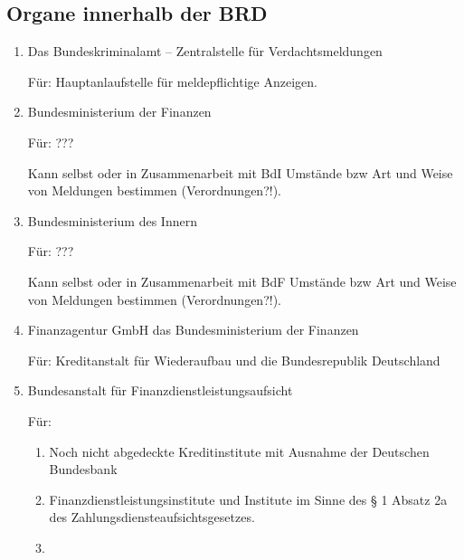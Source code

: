 \documentclass{article}
\begin{document}
        \subsection[Organe BRD]{Organe innerhalb der BRD}

            \begin{enumerate}

                \item Das Bundeskriminalamt – Zentralstelle für Verdachtsmeldungen

                    Für: Hauptanlaufstelle für meldepflichtige Anzeigen.

                \item Bundesministerium der Finanzen

                    Für: ???

                    Kann selbst oder in Zusammenarbeit mit BdI Umstände bzw Art und Weise von Meldungen bestimmen (Verordnungen?!).

                \item Bundesministerium des Innern

                    Für: ???

                    Kann selbst oder in Zusammenarbeit mit BdF Umstände bzw Art und Weise von Meldungen bestimmen (Verordnungen?!).                

                \item Finanzagentur GmbH das Bundesministerium der Finanzen

                     Für: Kreditanstalt für Wiederaufbau und die Bundesrepublik Deutschland

                \item Bundesanstalt für Finanzdienstleistungsaufsicht
                   
                    Für: 
                    \begin{enumerate}
                        \item
                            
                            Noch nicht abgedeckte Kreditinstitute mit Ausnahme der Deutschen Bundesbank

                        \item

                            Finanzdienstleistungsinstitute und Institute im Sinne des § 1 Absatz
                            2a des Zahlungsdiensteaufsichtsgesetzes.

                        \item


\end{enumerate}
\end{enumerate}
\end{document}

